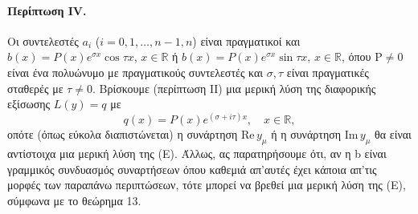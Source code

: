 \documentclass[11pt,a4paper,twoside]{book}
\begin{document}
\paragraph{Περίπτωση IV.} Οι συντελεστές $a_i$ ($i=0,1,\dots,n-1,n$) είναι πραγματικοί και $b(x)=P(x)e^{\sigma x}\cos\tau x$, $x\in\mathbb{R}$ ή $b(x)=P(x)e^{\sigma x}\sin\tau x$, $x\in\mathbb{R}$, όπου P$\neq 0$ είναι ένα πολυώνυμο με πραγματικούς συντελεστές και $\sigma, \tau$ είναι πραγματικές σταθερές με $\tau\neq 0$. Βρίσκουμε (περίπτωση ΙΙ) μια μερική λύση της διαφορικής εξίσωσης $L(y)=q$ με
\[
    q(x)=P(x)e^{(\sigma+i\tau)x}, \quad x\in\mathbb{R},
\]
οπότε (όπως εύκολα διαπιστώνεται) η συνάρτηση Re\,$y_\mu$ ή η συνάρτηση Im\,$y_\mu$ θα είναι αντίστοιχα μια μερική λύση της (Ε).
Άλλως, ας παρατηρήσουμε ότι, αν η b είναι γραμμικός συνδυασμός συναρτήσεων όπου καθεμιά απ'αυτές έχει κάποια απ'τις μορφές των παραπάνω περιπτώσεων, τότε μπορεί να βρεθεί μια μερική λύση της (Ε), σύμφωνα με το θεώρημα 13.
\end{document}
